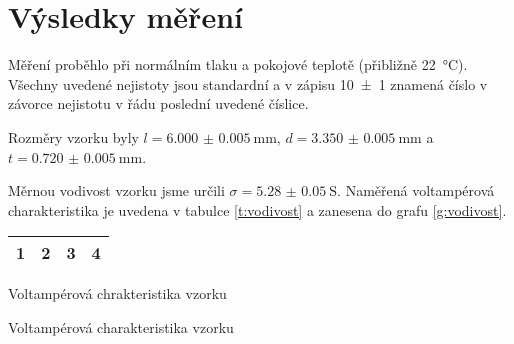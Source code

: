 \section*{Výsledky měření}
Měření proběhlo při normálním tlaku a pokojové teplotě (přibližně \SI{22}{\degreeCelsius}).
Všechny uvedené nejistoty jsou standardní a v zápisu \num{10(1)} znamená číslo v závorce nejistotu v řádu poslední uvedené číslice.

Rozměry vzorku byly $l=\SI{6.000(5)}{\mm}$, $d=\SI{3.350(5)}{\mm}$ a $t=\SI{0.720(5)}{\mm}$.




Měrnou vodivost vzorku jsme určili $\sigma = \SI{5.28(5)}{\siemens}$.
Naměřená voltampérová charakteristika je uvedena v tabulce \ref{t:vodivost} a zanesena do grafu \ref{g:vodivost}.


\begin{tabulka}[htbp]
\centering
\begin{tabular}{|cccc|}
\hline 
1 & 2 & 3 & 4 \\
\hline
\end{tabular}
\caption{Voltampérová chrakteristika vzorku}
\label{t:vodivost}
\end{tabulka}

\begin{graph}[htbp] 
\centering

\caption{Voltampérová charakteristika vzorku}
\label{g:vodivost}
\end{graph}